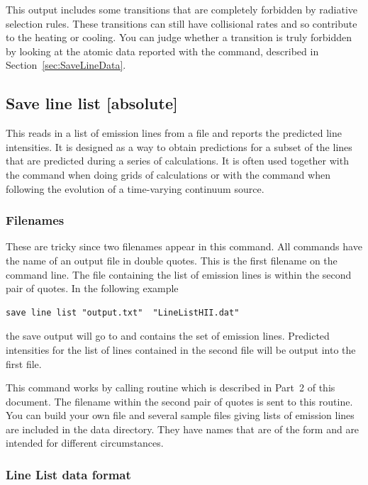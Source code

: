 This output includes some transitions that are completely forbidden by
radiative selection rules.  These transitions can still have collisional
rates and so contribute to the heating or cooling.  You can judge
whether a transition is truly forbidden by looking at the atomic data
reported with the  command, described in
Section~\ref{sec:SaveLineData}.

\subsection{Save line list [absolute]}

This reads in a list of emission lines from a file and reports the
predicted line intensities.  It is designed as a way to obtain predictions
for a subset of the lines that are predicted during a series of calculations.
It is often used together with the  command
when doing grids of calculations or with the  command
when following the evolution of a time-varying
continuum source.

\subsubsection{Filenames}  
These are tricky since two filenames appear in this command.
All  commands have the name of an output file
in double quotes.
This is the first filename on the command line.
The file containing the list
of emission lines is within the second pair of quotes.  In the following
example
\begin{verbatim}
save line list "output.txt"  "LineListHII.dat"
\end{verbatim}
the save output will go to 
and  contains the
set of emission lines.
Predicted intensities for the list of lines contained
in the second file will be output into the first file.
 
This command works by calling routine 
which is described in Part~2 of this document.
The filename within the second pair of quotes
is sent to this routine.
You can build your own file and several sample
files giving lists of emission lines are included in the data directory.
They have names that are of the form 
and are intended for different circumstances.

\subsubsection{Line List data format}
\label{sec:LineListDataFormat}

